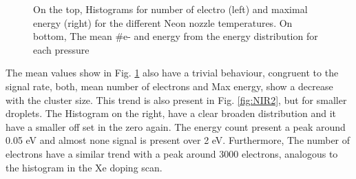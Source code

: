 \begin{figure}[h!]
\captionsetup[subfloat]{farskip=2pt,captionskip=1pt}
\centering
\hspace*{\fill}%
\hspace*{\fill}%

\hspace*{\fill}%
\hspace*{\fill}%
\caption[MIR Neon Size scan. Mean values and Histograms]{On the top, Histograms for number of electro (left) and maximal energy (right) for the different Neon nozzle temperatures. On bottom, The mean $\#$e- and energy from the energy distribution for each pressure}
\label{fig:Nehistosize}
\end{figure}


The mean values show in Fig. \ref{fig:Nehistosize} also have a trivial behaviour, congruent to the signal rate, both, mean number of electrons and Max energy, show a decrease with the cluster size. This trend is also present in Fig. \ref{fig:NIR2}, but for smaller droplets. The Histogram on the right, have a clear broaden distribution and it have a smaller off set in the zero again. The energy count present a peak around 0.05 eV and almost none signal is present over 2 eV. Furthermore, The number of electrons have a similar trend  with a peak around 3000 electrons, analogous to the histogram in the Xe doping scan.

